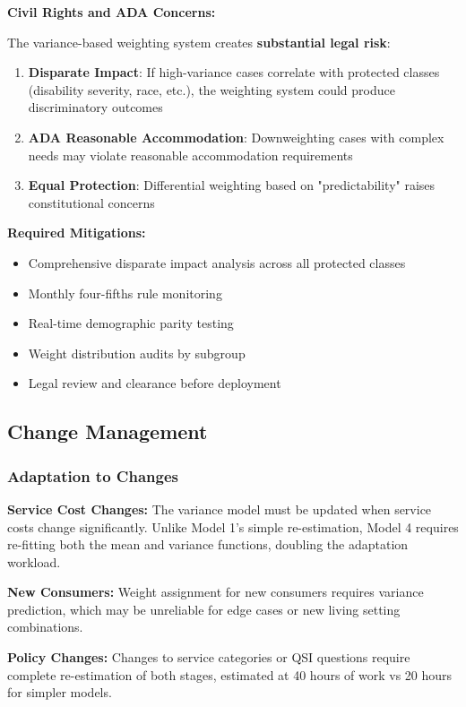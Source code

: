 \textbf{Civil Rights and ADA Concerns:}

The variance-based weighting system creates \textbf{substantial legal risk}:
\begin{enumerate}
    \item \textbf{Disparate Impact}: If high-variance cases correlate with protected classes (disability severity, race, etc.), the weighting system could produce discriminatory outcomes
    \item \textbf{ADA Reasonable Accommodation}: Downweighting cases with complex needs may violate reasonable accommodation requirements
    \item \textbf{Equal Protection}: Differential weighting based on "predictability" raises constitutional concerns
\end{enumerate}

\textbf{Required Mitigations:}
\begin{itemize}
    \item Comprehensive disparate impact analysis across all protected classes
    \item Monthly four-fifths rule monitoring
    \item Real-time demographic parity testing
    \item Weight distribution audits by subgroup
    \item Legal review and clearance before deployment
\end{itemize}

\subsection{Change Management}

\subsubsection{Adaptation to Changes}

\textbf{Service Cost Changes:} The variance model must be updated when service costs change significantly. Unlike Model 1's simple re-estimation, Model 4 requires re-fitting both the mean and variance functions, doubling the adaptation workload.

\textbf{New Consumers:} Weight assignment for new consumers requires variance prediction, which may be unreliable for edge cases or new living setting combinations.

\textbf{Policy Changes:} Changes to service categories or QSI questions require complete re-estimation of both stages, estimated at 40 hours of work vs 20 hours for simpler models.

